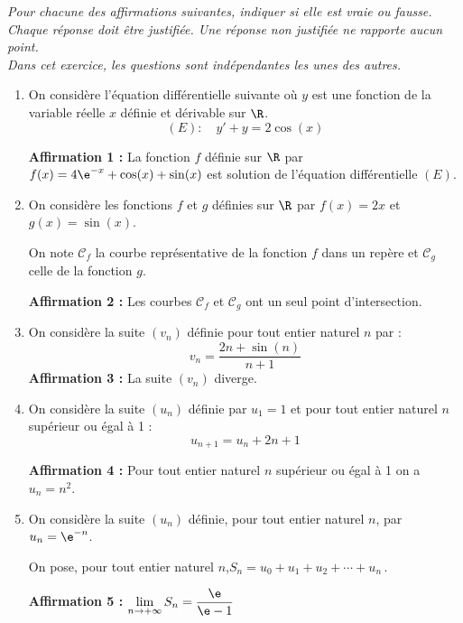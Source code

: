 \emph{Pour chacune des affirmations suivantes, indiquer si elle est vraie ou fausse.\\
		Chaque réponse doit être justifiée. Une réponse non justifiée ne rapporte aucun point.\\ Dans cet exercice, les questions sont indépendantes les unes des autres.}
	
	\begin{enumerate}[itemsep=5mm]
		\item On considère l'équation différentielle suivante où $y$ est une fonction de la variable réelle $x$ définie et dérivable sur $\R$.
		\[(E): \quad y'+y=2 \cos (x)\]
		
		\textbf{Affirmation 1 :} La fonction $f$ définie sur $\R$ par
		\quad $f(x)=4 \e^{-x}+\cos (x)+\sin (x)$\quad
		est solution de l'équation différentielle $(E)$.
		
		\item On considère les fonctions $f$ et $g$ définies sur $\R$ par \quad $f(x)=2 x$ \quad et \quad $g(x)=\sin (x)$.
		
		On note $\mathcal{C}_{f}$ la courbe représentative de la fonction $f$ dans un repère et $\mathcal{C}_{g}$ celle de la fonction $g$.
		
		\textbf{Affirmation 2 :} Les courbes $\mathcal{C}_{f}$ et $\mathcal{C}_{g}$ ont un seul point d'intersection.
		
		\item On considère la suite $(v_{n})$ définie pour tout entier naturel $n$ par :
		\[v_{n}=\dfrac{2 n+\sin (n)}{n+1}\]
		\textbf{Affirmation 3 :} La suite $\left(v_{n}\right)$ diverge.
		
		\item On considère la suite $(u_{n})$ définie par $u_{1}=1$ et pour tout entier naturel $n$ supérieur ou égal à 1 :
		\[u_{n+1}=u_{n}+2 n+1\]
		
		\textbf{Affirmation 4 :} Pour tout entier naturel $n$ supérieur ou égal à 1 on a $u_{n}=n^{2}$.
		
		\item On considère la suite $(u_{n})$ définie, pour tout entier naturel $n$, par $u_{n}=\e^{-n}$.
		
		On pose, pour tout entier naturel $n$,\quad $S_{n}=u_{0}+u_{1}+u_{2}+\cdots+u_{n}$\,.
		
		\textbf{Affirmation 5 :} $\lim\limits_{n \to +\infty} S_{n}=\dfrac{\e}{\e-1}$
	\end{enumerate}
